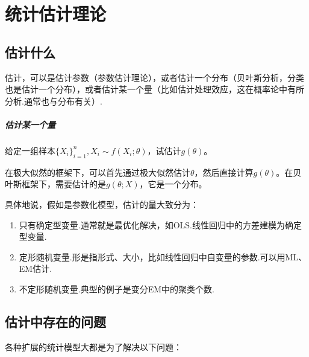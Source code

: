 \chapter{统计估计理论}\label{prob-stat-est}
\section{估计什么}
估计，可以是估计参数（参数估计理论），或者估计一个分布（贝叶斯分析，分类也是估计一个分布），或者估计某一个量（比如估计处理效应，这在概率论中有所分析.通常也与分布有关）.

\paragraph*{估计某一个量} 给定一组样本$\{X_i\}_{i=1}^n,X_i\sim f(X_i;\theta)$，试估计$g(\theta)$。

在极大似然的框架下，可以首先通过极大似然估计$\theta$，然后直接计算$g(\theta)$。在贝叶斯框架下，需要估计的是$g(\theta;X)$，它是一个分布。

具体地说，假如是参数化模型，估计的量大致分为：
\begin{enumerate}
\item 只有确定型变量.通常就是最优化解决，如OLS.线性回归中的方差建模为确定型变量.
\item 定形随机变量.形是指形式、大小，比如线性回归中自变量的参数.可以用ML、EM估计.
\item 不定形随机变量.典型的例子是变分EM中的聚类个数.
\end{enumerate}
\section{估计中存在的问题}
各种扩展的统计模型大都是为了解决以下问题：

